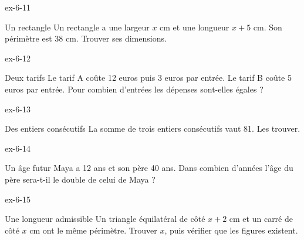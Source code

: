 \begin{blocLivre}{ex-6-11}\begin{exercice}[3]{Un rectangle}
Un rectangle a une largeur $x$ cm et une longueur $x+5$ cm. Son périmètre est 38 cm. Trouver ses dimensions.
\label{fig-ex-6-11}
\end{exercice}\end{blocLivre}
\begin{blocLivre}{ex-6-12}\begin{exercice}[3]{Deux tarifs}
Le tarif A coûte 12 euros puis 3 euros par entrée. Le tarif B coûte 5 euros par entrée. Pour combien d’entrées les dépenses sont-elles égales ?
\end{exercice}\end{blocLivre}
\begin{blocLivre}{ex-6-13}\begin{exercice}[3]{Des entiers consécutifs}
La somme de trois entiers consécutifs vaut 81. Les trouver.
\end{exercice}\end{blocLivre}
\begin{blocLivre}{ex-6-14}\begin{exercice}[3]{Un âge futur}
Maya a 12 ans et son père 40 ans. Dans combien d’années l’âge du père sera-t-il le double de celui de Maya ?
\end{exercice}\end{blocLivre}
\begin{blocLivre}{ex-6-15}\begin{exercice}[3]{Une longueur admissible}
Un triangle équilatéral de côté $x+2$ cm et un carré de côté $x$ cm ont le même périmètre. Trouver $x$, puis vérifier que les figures existent.
\label{fig-ex-6-15}
\end{exercice}\end{blocLivre}

\clearpage
